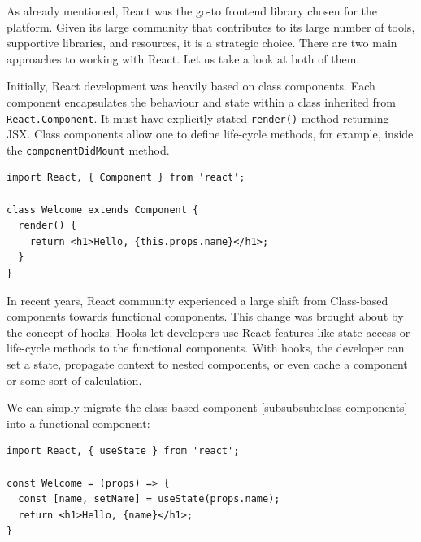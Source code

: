 As already mentioned, React was the go-to frontend library chosen for the platform. 
Given its large community that contributes to its large number of tools, supportive libraries, and resources, it is a strategic choice.
There are two main approaches to working with React. Let us take a look at both of them.

\label{subsubsub:class-components}
Initially, React development was heavily based on class components.
Each component encapsulates the behaviour and state within a class inherited from \texttt{React.Component}.
It must have explicitly stated \texttt{render()} method returning JSX.
Class components allow one to define life-cycle methods, for example, inside the \texttt{componentDidMount} method.

\medskip
\begin{lstlisting}[caption=React class based component exmaple]
import React, { Component } from 'react';

class Welcome extends Component {
  render() {
    return <h1>Hello, {this.props.name}</h1>;
  }
}

\end{lstlisting}



\label{subsubsub:functional-components}
In recent years, React community experienced a large shift from Class-based components towards functional components.
This change was brought about by the concept of hooks. 
Hooks let developers use React features like state access or life-cycle methods to the functional components.
With hooks, the developer can set a state, propagate context to nested components, or even cache a component or some sort of calculation.

We can simply migrate the class-based component \ref{subsubsub:class-components} into a functional component:

\medskip
\begin{lstlisting}[caption=React class based component exmaple]
import React, { useState } from 'react';

const Welcome = (props) => {
  const [name, setName] = useState(props.name);
  return <h1>Hello, {name}</h1>;
}
\end{lstlisting}

